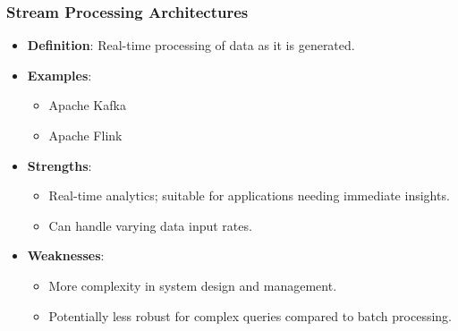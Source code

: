 \documentclass[aspectratio=169]{beamer}
\begin{document}
\begin{frame}[fragile]
    \frametitle{Stream Processing Architectures}
    \begin{itemize}
        \item \textbf{Definition}: Real-time processing of data as it is generated.
        \item \textbf{Examples}: 
            \begin{itemize}
                \item Apache Kafka
                \item Apache Flink
            \end{itemize}
        \item \textbf{Strengths}:
            \begin{itemize}
                \item Real-time analytics; suitable for applications needing immediate insights.
                \item Can handle varying data input rates.
            \end{itemize}
        \item \textbf{Weaknesses}:
            \begin{itemize}
                \item More complexity in system design and management.
                \item Potentially less robust for complex queries compared to batch processing.
            \end{itemize}
    \end{itemize}
\end{frame}
\end{document}
